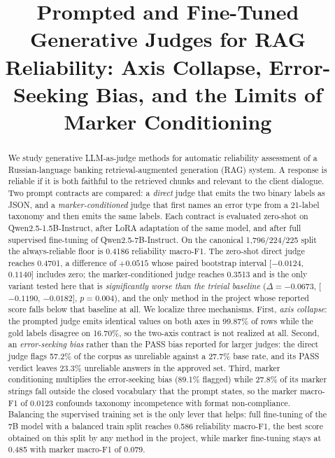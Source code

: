 \documentclass{zapiski}
\date{}
\begin{document}
\title[Prompted and Fine-Tuned RAG Judges]{Prompted and Fine-Tuned Generative
Judges for RAG Reliability: Axis Collapse, Error-Seeking Bias, and the Limits
of Marker Conditioning}

\author[Team~14\_1]{}
\author[Team~14\_1]{}
\author[Team~14\_1]{}
\author[Team~14\_1]{}

\begin{abstract}
We study generative LLM-as-judge methods for automatic reliability assessment
of a Russian-language banking retrieval-augmented generation (RAG) system. A
response is reliable if it is both faithful to the retrieved chunks and
relevant to the client dialogue. Two prompt contracts are compared: a
\emph{direct} judge that emits the two binary labels as JSON, and a
\emph{marker-conditioned} judge that first names an error type from a
21-label taxonomy and then emits the same labels. Each contract is evaluated
zero-shot on Qwen2.5-1.5B-Instruct, after LoRA adaptation of the same model,
and after full supervised fine-tuning of Qwen2.5-7B-Instruct. On the canonical
1,796/224/225 split the always-reliable floor is 0.4186 reliability macro-F1.
The zero-shot direct judge reaches 0.4701, a difference of $+0.0515$ whose
paired bootstrap interval [$-0.0124$, $0.1140$] includes zero; the
marker-conditioned judge reaches 0.3513 and is the only variant tested here
that is \emph{significantly worse than the trivial baseline}
($\Delta=-0.0673$, [$-0.1190$, $-0.0182$], $p=0.004$), and the only method in
the project whose reported score falls below that baseline at all. We localize three
mechanisms. First, \emph{axis collapse}: the prompted judge emits identical
values on both axes in 99.87\% of rows while the gold labels disagree on
16.70\%, so the two-axis contract is not realized at all. Second, an
\emph{error-seeking bias} rather than the PASS bias reported for larger
judges: the direct judge flags 57.2\% of the corpus as unreliable against a
27.7\% base rate, and its PASS verdict leaves 23.3\% unreliable answers in the
approved set. Third, marker conditioning multiplies the error-seeking bias
(89.1\% flagged) while 27.8\% of its marker strings fall outside the closed
vocabulary that the prompt states, so the marker macro-F1 of 0.0123 confounds
taxonomy incompetence with format non-compliance. Balancing the supervised
training set is the only lever that helps: full fine-tuning of the 7B model
with a balanced train split reaches 0.586 reliability macro-F1, the best score
obtained on this split by any method in the project, while marker
fine-tuning stays at 0.485 with marker macro-F1 of 0.079.
\end{abstract}
\end{document}
